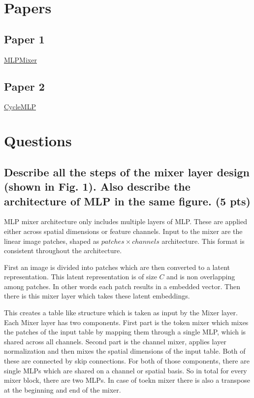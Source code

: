 \documentclass{article}
\title{\mathbf{Discussion Quiz \#11}}
\author{{Ashutosh Tiwari (ashutiwa@iu.edu)}}
\begin{document}
\maketitle

\section{Papers}
\subsection{Paper 1}
    \href{https://arxiv.org/pdf/2105.01601.pdf}{MLPMixer}
\subsection{Paper 2}
    \href{https://arxiv.org/pdf/2107.10224.pdf}{CycleMLP}

\section{Questions}

\subsection{Describe all the steps of the mixer layer design (shown in Fig. 1). Also describe the architecture of MLP in the same figure. (5 pts)}

MLP mixer architecture only includes multiple layers of MLP. These are applied either across spatial dimensions or feature channels. Input to the mixer are the linear image patches, shaped as $patches \times channels$ architecture. This format is consistent throughout the architecture.

First an image is divided into patches which are then converted to a latent representation. This latent representation is of size $C$ and is non overlapping among patches. In other words each patch results in a embedded vector. Then there is this mixer layer which takes these latent embeddings.

This creates a table like structure which is taken as input by the Mixer layer. Each Mixer layer has two components. First part is the token mixer which mixes the patches of the input table by mapping them through a single MLP, which is shared across all channels. Second part is the channel mixer, applies layer normalization and then mixes the spatial dimensions of the input table. Both of these are connected by skip connections. For both of those components, there are single MLPs which are shared on a channel or spatial basis. So in total for every mixer block, there are two MLPs. In case of toekn mixer there is also a transpose at the beginning and end of the mixer.
\end{document}

